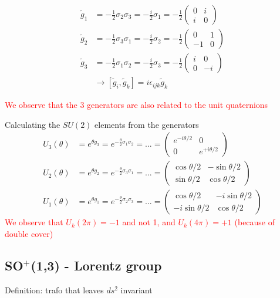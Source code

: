 \documentclass[../main.tex]{subfiles}
\begin{document}
\begin{itemize}
\begin{align}
\tilde{g}_1
&=-\frac{1}{2}\sigma_2\sigma_3
=-\frac{i}{2}\sigma_1
=-\frac{1}{2}\left(\begin{matrix}
0 & i\\
i & 0
\end{matrix}\right)\\
\tilde{g}_2
&=-\frac{1}{2}\sigma_3\sigma_1
=-\frac{i}{2}\sigma_2
=-\frac{1}{2}\left(\begin{matrix}
0 & 1\\
-1 & 0
\end{matrix}\right)\\
\tilde{g}_3
&=-\frac{1}{2}\sigma_1\sigma_2
=-\frac{i}{2}\sigma_3
=-\frac{1}{2}\left(\begin{matrix}
i & 0\\
0 & -i
\end{matrix}\right)\\
&\rightarrow[\tilde{g}_i,\tilde{g}_k]=i\epsilon_{ijk}\tilde{g}_k
\end{align}

\textcolor{red}{We observe that the 3 generators are also related to the unit quaternions}

Calculating the $SU(2)$ elements from the generators
\begin{align}
U_3(\theta)&=e^{\theta g_3}=e^{-\frac{\theta}{2}\sigma_1\sigma_2}=...=\left(\begin{matrix}
e^{-i\theta/2} & 0\\
0 & e^{+i\theta/2}
\end{matrix}
\right)\\
%
U_2(\theta)&=e^{\theta g_2}=e^{-\frac{\theta}{2}\sigma_3\sigma_1}=...=\left(\begin{matrix}
\cos\theta/2 & -\sin\theta/2\\
\sin\theta/2 & \cos\theta/2
\end{matrix}
\right)\\
%
U_1(\theta)&=e^{\theta g_1}=e^{-\frac{\theta}{2}\sigma_2\sigma_3}=...=\left(\begin{matrix}
\cos\theta/2 & -i\sin\theta/2\\
-i\sin\theta/2 & \cos\theta/2
\end{matrix}
\right)
\end{align}
\textcolor{red}{We observe that $U_k(2\pi)=-1$ and not 1, and $U_k(4\pi)=+1$ (because of double cover)}



\subsection{SO$^+$(1,3) - Lorentz group }
Definition: trafo that leaves $ds^2$ invariant


\end{itemize}
\end{document}
